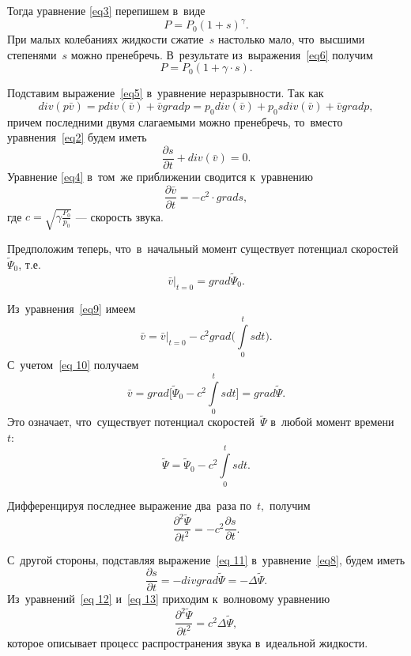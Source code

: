Тогда уравнение \eqref{eq3} перепишем в~виде
\begin{equation}\label{eq6}
P=P_0(1+s)^\gamma.
\end{equation}
При малых колебаниях жидкости сжатие~$s$ настолько мало, что~высшими степенями~$s$ можно пренебречь. В~результате из~выражения~\eqref{eq6} получим
\begin{equation}\label{eq7}
P=P_0(1+\gamma \cdot s).
\end{equation}

Подставим выражение~\eqref{eq5} в~уравнение неразрывности. Так как 
$$
 div(p \bar{v})= p div(\bar{v})+\bar{v}  grad p = p_0  div(\bar{v}) + p_0 s  div(\bar{v}) + \bar{v}  grad p,
$$
причем последними двумя слагаемыми можно пренебречь, то~вместо уравнения~\eqref{eq2} будем иметь
\begin{equation}\label{eq8}
\frac{\partial s}{\partial t} +  div (\bar{v}) = 0.
\end{equation}
Уравнение \eqref{eq4} в~том~же приближении сводится к~уравнению
\begin{equation}\label{eq9}
\frac{\partial \bar{v}}{\partial t} = -c^2\cdot grad s,
\end{equation}
где $c=\sqrt{\gamma \frac{P_0}{p_0}}$ --- скорость звука.

Предположим теперь, что~в~начальный момент существует потенциал скоростей~$\tilde\Psi_0$, т.е.
\begin{equation}\label{eq 10}
\bar{v}\big|_{t=0}= grad\tilde\Psi_0.
\end{equation}

Из~уравнения~\eqref{eq9} имеем
$$
\bar{v}=\bar{v}\big|_{t=0}-c^2 grad \bigg(\int\limits_{0}^{t} s d \! t\bigg).
$$
С~учетом~\eqref{eq 10} получаем
\begin{equation}\label{eq 11}
\bar{v}= grad\bigg[\tilde\Psi_0-c^2\int\limits_{0}^{t} s d \! t\bigg]= grad\tilde\Psi.
\end{equation}
Это означает, что~существует потенциал скоростей~$\tilde\Psi$ в~любой момент времени~$t:$
$$
\tilde\Psi=\tilde\Psi_0-c^2\int\limits_{0}^{t} s d \! t.
$$

Дифференцируя последнее выражение два~раза по~$t,$ получим
\begin{equation}\label{eq 12}
\frac{\partial^2\tilde\Psi}{\partial t^2}=-c^2\frac{\partial s}{\partial t}.
\end{equation}

С~другой стороны, подставляя выражение~\eqref{eq 11} в~уравнение~\eqref{eq8}, будем иметь
\begin{equation}\label{eq 13}
\frac{\partial s}{\partial t}=- div grad\tilde\Psi=-\Delta\tilde\Psi.
\end{equation}
Из~уравнений~\eqref{eq 12} и~\eqref{eq 13} приходим к~волновому уравнению
\begin{equation}\label{eq 14}
\frac{\partial^2\tilde\Psi}{\partial t^2}=c^2\Delta\tilde\Psi,
\end{equation}
которое описывает процесс распространения звука в~идеальной жидкости.


